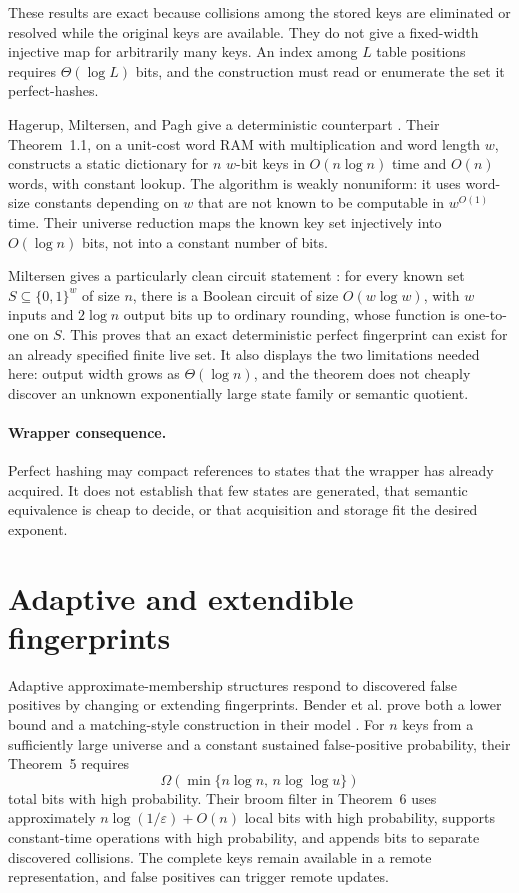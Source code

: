 \documentclass[11pt]{article}
\begin{document}
These results are exact because collisions among the stored keys are
eliminated or resolved while the original keys are available.  They do not
give a fixed-width injective map for arbitrarily many keys.  An index among
$L$ table positions requires $\Theta(\log L)$ bits, and the construction must
read or enumerate the set it perfect-hashes.

Hagerup, Miltersen, and Pagh give a deterministic counterpart
\cite{hagerup2001}.  Their Theorem~1.1, on a unit-cost word RAM with
multiplication and word length $w$, constructs a static dictionary for $n$
$w$-bit keys in $O(n\log n)$ time and $O(n)$ words, with constant lookup.
The algorithm is weakly nonuniform: it uses word-size constants depending on
$w$ that are not known to be computable in $w^{O(1)}$ time.  Their universe
reduction maps the known key set injectively into $O(\log n)$ bits, not into a
constant number of bits.

Miltersen gives a particularly clean circuit statement
\cite{miltersen1997}: for every known set
$S\subseteq\{0,1\}^w$ of size $n$, there is a Boolean circuit of size
$O(w\log w)$, with $w$ inputs and $2\log n$ output bits up to ordinary
rounding, whose function is one-to-one on $S$.  This proves that an exact
deterministic perfect fingerprint can exist for an already specified finite
live set.  It also displays the two limitations needed here: output width
grows as $\Theta(\log n)$, and the theorem does not cheaply discover an
unknown exponentially large state family or semantic quotient.

\paragraph{Wrapper consequence.}
Perfect hashing may compact references to states that the wrapper has already
acquired.  It does not establish that few states are generated, that semantic
equivalence is cheap to decide, or that acquisition and storage fit the
desired exponent.

\section{Adaptive and extendible fingerprints}

Adaptive approximate-membership structures respond to discovered false
positives by changing or extending fingerprints.  Bender et al. prove both a
lower bound and a matching-style construction in their model
\cite{bender2018}.  For $n$ keys from a sufficiently large universe and a
constant sustained false-positive probability, their Theorem~5 requires
\[
 \Omega\!\left(\min\{n\log n,\,n\log\log u\}\right)
\]
total bits with high probability.  Their broom filter in Theorem~6 uses
approximately $n\log(1/\varepsilon)+O(n)$ local bits with high probability,
supports constant-time operations with high probability, and appends bits to
separate discovered collisions.  The complete keys remain available in a
remote representation, and false positives can trigger remote updates.
\end{document}
